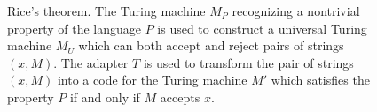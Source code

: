 \begin{figure}
\centering



\caption{Rice's theorem. The Turing machine $M_P$ recognizing a nontrivial property of the language $P$ is used to construct a universal Turing machine $M_U$ which can both accept and reject pairs of strings $\left(x, M\right)$. The adapter $T$ is used to transform the pair of strings $\left(x, M\right)$ into a code for the Turing machine $M'$ which satisfies the property $P$ if and only if $M$ accepts $x$.} 
\label{figAddAlgoRiceTheorem}
\end{figure}